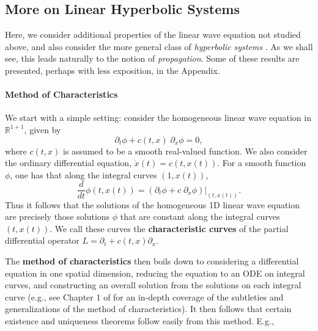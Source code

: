 \documentclass{article}
\begin{document}
\subsection{More on Linear Hyperbolic Systems} 

Here, we consider additional properties of the linear wave equation not studied above, and also consider the more general class of \textit{hyperbolic systems} \cite{Rauch2012}. As we shall see, this leads naturally to the notion of \textit{propagation}. Some of these results are presented, perhaps with less exposition, in the Appendix. 

\paragraph{Method of Characteristics} 

We start with a simple setting: consider the homogeneous linear wave equation in $\mathbb{R}^{1 + 1}$, given by 
\begin{equation*}
	\partial_{t}\phi + c(t, x)\;\partial_{x}\phi  = 0, 
\end{equation*}
where $c(t, x)$ is assumed to be a smooth real-valued function. We also consider the ordinary differential equation, $\dot{x}(t)= c(t, x(t))$. For a smooth function $\phi$, one has that along the integral curves $(1, x(t))$, 
\begin{equation*}
	\frac{d}{dt}\phi(t, x(t)) = (\partial_{t}\phi + c\;\partial_{x}\phi)|_{(t, x(t))}. 
\end{equation*}
Thus it follows that the solutions of the homogeneous 1D linear wave equation are precisely those solutions $\phi$ that are constant along the integral curves $(t, x(t))$. We call these curves the \textbf{characteristic curves} of the partial differential operator $L = \partial_{t} + c(t, x)\partial_{x}$. 

The \textbf{method of characteristics} then boils down to considering a differential equation in one spatial dimension, reducing the equation to an ODE on integral curves, and constructing an overall solution from the solutions on each integral curve (e.g., see Chapter 1 of \cite{Folland} for an in-depth coverage of the subtleties and generalizations of the method of characteristics). It then follows that certain existence and uniqueness theorems follow easily from this method. E.g., 
\end{document}
